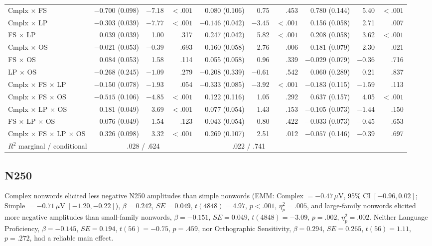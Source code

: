 \begin{table}[htbp]
{\begin{tabular}{l rrr rrr rrr}
		Cmplx $\times$ FS & $-0.700$ (0.098) & $-7.18$ & $<.001$ & 0.080 (0.106) & 0.75 & .453 & 0.780 (0.144) & 5.40 & $<.001$ \\
		Cmplx $\times$ LP & $-0.303$ (0.039) & $-7.77$ & $<.001$ & $-0.146$ (0.042) & $-3.45$ & $<.001$ & 0.156 (0.058) & 2.71 & .007 \\
		FS $\times$ LP & 0.039 (0.039) & 1.00 & .317 & 0.247 (0.042) & 5.82 & $<.001$ & 0.208 (0.058) & 3.62 & $<.001$ \\
		Cmplx $\times$ OS & $-0.021$ (0.053) & $-0.39$ & .693 & 0.160 (0.058) & 2.76 & .006 & 0.181 (0.079) & 2.30 & .021 \\
		FS $\times$ OS & 0.084 (0.053) & 1.58 & .114 & 0.055 (0.058) & 0.96 & .339 & $-0.029$ (0.079) & $-0.36$ & .716 \\
		LP $\times$ OS & $-0.268$ (0.245) & $-1.09$ & .279 & $-0.208$ (0.339) & $-0.61$ & .542 & 0.060 (0.289) & 0.21 & .837 \\
		Cmplx $\times$ FS $\times$ LP & $-0.150$ (0.078) & $-1.93$ & .054 & $-0.333$ (0.085) & $-3.92$ & $<.001$ & $-0.183$ (0.115) & $-1.59$ & .113 \\
		Cmplx $\times$ FS $\times$ OS & $-0.515$ (0.106) & $-4.85$ & $<.001$ & 0.122 (0.116) & 1.05 & .292 & 0.637 (0.157) & 4.05 & $<.001$ \\
		Cmplx $\times$ LP $\times$ OS & 0.181 (0.049) & 3.69 & $<.001$ & 0.077 (0.054) & 1.43 & .153 & $-0.105$ (0.073) & $-1.44$ & .150 \\
		FS $\times$ LP $\times$ OS & 0.076 (0.049) & 1.54 & .123 & 0.043 (0.054) & 0.80 & .422 & $-0.033$ (0.073) & $-0.45$ & .653 \\
		Cmplx $\times$ FS $\times$ LP $\times$ OS & 0.326 (0.098) & 3.32 & $<.001$ & 0.269 (0.107) & 2.51 & .012 & $-0.057$ (0.146) & $-0.39$ & .697 \\
		\midrule
		$R^2$ marginal / conditional & \multicolumn{3}{c}{.028 / .624} & \multicolumn{3}{c}{.022 / .741} & & & \\
		\bottomrule
	\end{tabular}%
	}
\end{table}

\subsection{N250}

Complex nonwords elicited less negative N250 amplitudes than simple nonwords (EMM: Complex $= -0.47\,\mu$V, 95\% CI $[-0.96, 0.02]$; Simple $= -0.71\,\mu$V $[-1.20, -0.22]$), $\beta = 0.242$, $SE = 0.049$, $t(4848) = 4.97$, $p < .001$, $\eta^2_p = .005$, and large-family nonwords elicited more negative amplitudes than small-family nonwords, $\beta = -0.151$, $SE = 0.049$, $t(4848) = -3.09$, $p = .002$, $\eta^2_p = .002$. Neither Language Proficiency, $\beta = -0.145$, $SE = 0.194$, $t(56) = -0.75$, $p = .459$, nor Orthographic Sensitivity, $\beta = 0.294$, $SE = 0.265$, $t(56) = 1.11$, $p = .272$, had a reliable main effect.

